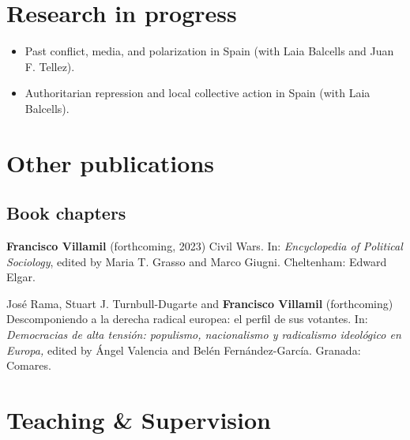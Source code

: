 \documentclass[a4paper, 12pt]{article}
\begin{document}
\section*{Research in progress}

\begin{itemize}[leftmargin=*, nolistsep]
\item Past conflict, media, and polarization in Spain (with Laia Balcells and Juan F. Tellez).
\item Authoritarian repression and local collective action in Spain (with Laia Balcells).
\end{itemize}

\section*{Other publications}

\subsection*{Book chapters}

\begin{etaremune}[leftmargin=12pt, itemsep=0pt]
\item \textbf{Francisco Villamil} (forthcoming, 2023) Civil Wars. In: \textit{Encyclopedia of Political Sociology}, edited by Maria T. Grasso and Marco Giugni. Cheltenham: Edward Elgar.
\item José Rama, Stuart J. Turnbull-Dugarte and \textbf{Francisco Villamil} (forthcoming) Descomponiendo a la derecha radical europea: el perfil de sus votantes. In: \textit{Democracias de alta tensión: populismo, nacionalismo y radicalismo ideológico en Europa,} edited by Ángel Valencia and Belén Fernández-García. Granada: Comares.
\end{etaremune}

\section*{Teaching \& Supervision}

\end{document}
